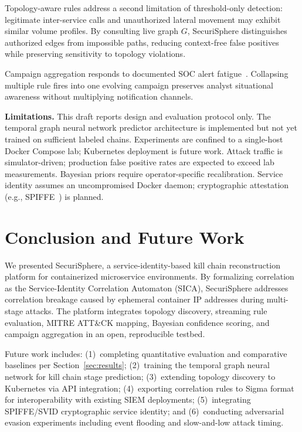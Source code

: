 \documentclass[conference]{IEEEtran}
\begin{document}
Topology-aware rules address a second limitation of threshold-only
detection: legitimate inter-service calls and unauthorized lateral movement
may exhibit similar volume profiles. By consulting live graph $G$,
SecuriSphere distinguishes authorized edges from impossible paths, reducing
context-free false positives while preserving sensitivity to topology
violations.

Campaign aggregation responds to documented SOC alert fatigue~\cite{pietraszek2005,sundaramurthy2014}.
Collapsing multiple rule fires into one evolving campaign preserves analyst
situational awareness without multiplying notification channels.

\textbf{Limitations.}
This draft reports design and evaluation protocol only. The temporal graph
neural network predictor architecture is implemented but not yet trained on
sufficient labeled chains. Experiments are confined to a single-host Docker
Compose lab; Kubernetes deployment is future work. Attack traffic is
simulator-driven; production false positive rates are expected to exceed lab
measurements. Bayesian priors require operator-specific recalibration.
Service identity assumes an uncompromised Docker daemon; cryptographic
attestation (e.g., SPIFFE~\cite{spiffe2023}) is planned.

\section{Conclusion and Future Work}
\label{sec:conclusion}

We presented SecuriSphere, a service-identity-based kill chain
reconstruction platform for containerized microservice environments.
By formalizing correlation as the Service-Identity Correlation Automaton
(SICA), SecuriSphere addresses correlation breakage caused by ephemeral
container IP addresses during multi-stage attacks. The platform integrates
topology discovery, streaming rule evaluation, MITRE ATT\&CK mapping,
Bayesian confidence scoring, and campaign aggregation in an open,
reproducible testbed.

Future work includes: (1)~completing quantitative evaluation and comparative
baselines per Section~\ref{sec:results}; (2)~training the temporal graph
neural network for kill chain stage prediction; (3)~extending topology
discovery to Kubernetes via API integration; (4)~exporting correlation
rules to Sigma format for interoperability with existing SIEM deployments;
(5)~integrating SPIFFE/SVID cryptographic service identity; and
(6)~conducting adversarial evasion experiments including event flooding and
slow-and-low attack timing.
\end{document}
